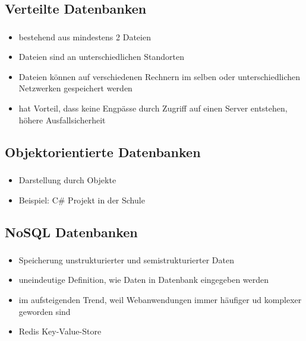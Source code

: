 \documentclass[aspectratio=169,14pt,xcolor=dvipsnames]{beamer}
\begin{document}
\subsection{Verteilte Datenbanken}
\begin{frame}[t]
    \frametitle{\subsecname}
    \begin{itemize}
        \item bestehend aus mindestens 2 Dateien
        \item Dateien sind an unterschiedlichen Standorten
        \item Dateien können auf verschiedenen Rechnern im selben oder unterschiedlichen Netzwerken gespeichert werden
        \item hat Vorteil, dass keine Engpässe durch Zugriff auf einen Server entstehen, höhere Ausfallsicherheit
    \end{itemize}
\end{frame}

\subsection{Objektorientierte Datenbanken}
\begin{frame}[t]
    \frametitle{\subsecname}
    \begin{itemize}
        \item Darstellung durch Objekte
        \item Beispiel: C\# Projekt in der Schule 
    \end{itemize}
\end{frame}

\subsection{NoSQL Datenbanken}
\begin{frame}[t]
    \frametitle{\subsecname}
    \begin{itemize}
        \item Speicherung unstrukturierter und semistrukturierter Daten
        \item uneindeutige Definition, wie Daten in Datenbank eingegeben werden
        \item im aufsteigenden Trend, weil Webanwendungen immer häufiger ud komplexer geworden sind
        \item Redis Key-Value-Store
    \end{itemize}
\end{frame}
\end{document}
